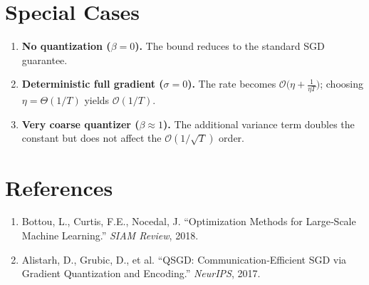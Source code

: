 \documentclass{article}
\begin{document}
\section*{Special Cases}
\begin{enumerate}[label=(\alph*)]
    \item \textbf{No quantization ($\beta=0$).} The bound reduces to the standard SGD guarantee.
    \item \textbf{Deterministic full gradient ($\sigma=0$).} The rate becomes $\mathcal{O}\bigl(\eta + \frac{1}{\eta T}\bigr)$; choosing $\eta=\Theta(1/T)$ yields $\mathcal{O}(1/T)$.
    \item \textbf{Very coarse quantizer ($\beta\approx 1$).} The additional variance term doubles the constant but does not affect the $\mathcal{O}(1/\sqrt{T})$ order.
\end{enumerate}

\section*{References}
\begin{enumerate}
    \item Bottou, L., Curtis, F.E., Nocedal, J. “Optimization Methods for Large‑Scale Machine Learning.” \emph{SIAM Review}, 2018.
    \item Alistarh, D., Grubic, D., et al. “QSGD: Communication‑Efficient SGD via Gradient Quantization and Encoding.” \emph{NeurIPS}, 2017.
\end{enumerate}
\end{document}
